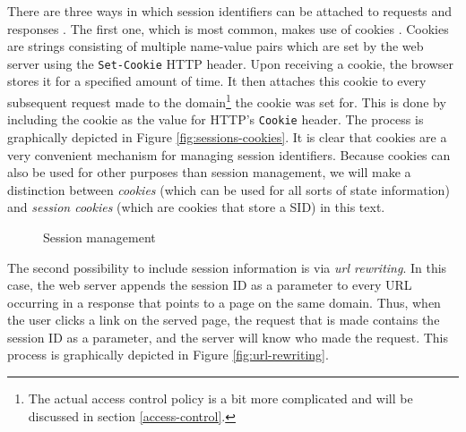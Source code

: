 \label{cookie-header}There are three ways in which session identifiers can be attached to requests and responses \cite{Jovanovic2006}. The first one, which is most common, makes use of \glspl{cookie} \cite{Kristol2001, Park2000}. Cookies are strings consisting of multiple name-value pairs which are set by the web server using the \texttt{Set-Cookie} HTTP header. Upon receiving a cookie, the browser stores it for a specified amount of time. It then attaches this cookie to every subsequent request made to the domain\footnote{The actual access control policy is a bit more complicated and will be discussed in section \ref{access-control}.} the cookie was set for. This is done by including the cookie as the value for HTTP's \texttt{Cookie} header. The process is graphically depicted in Figure \ref{fig:sessions-cookies}. It is clear that cookies are a very convenient mechanism for managing session identifiers. Because cookies can also be used for other purposes than session management, we will make a distinction between \emph{cookies} (which can be used for all sorts of state information) and \emph{\glspl{session cookie}} (which are cookies that store a SID) in this text.

\begin{figure}[ht]
	\centering
	\caption{Session management}
\end{figure}

The second possibility to include session information is via \emph{\gls{url} rewriting}. In this case, the web server appends the session ID as a parameter to every URL occurring in a response that points to a page on the same domain. Thus, when the user clicks a link on the served page, the request that is made contains the session ID as a parameter, and the server will know who made the request. This process is graphically depicted in Figure \ref{fig:url-rewriting}.

